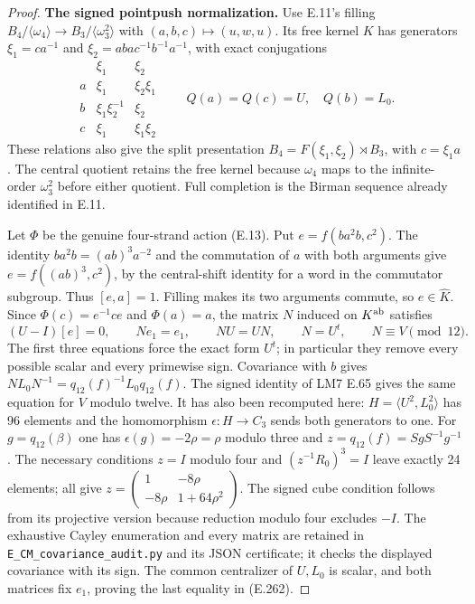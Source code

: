 \begin{proof}
\par\medskip\noindent\textbf{The signed pointpush normalization.}\quad
Use E.11's filling
$B_4/\langle\omega_4\rangle\to
B_3/\langle\omega_3^2\rangle$ with
$(a,b,c)\mapsto(u,w,u)$.
Its free kernel $K$ has generators
$\xi_1=ca^{-1}$ and
$\xi_2=aba c^{-1}b^{-1}a^{-1}$, with exact conjugations
\[
\begin{array}{c|cc}
 &\xi_1&\xi_2\\ \hline
 a&\xi_1&\xi_2\xi_1\\
 b&\xi_1\xi_2^{-1}&\xi_2\\
 c&\xi_1&\xi_1\xi_2
\end{array}
 \qquad Q(a)=Q(c)=U,\quad Q(b)=L_0.
                                                               \tag{E.261}
\]
These relations also give the split presentation
$B_4=F(\xi_1,\xi_2)\rtimes B_3$, with $c=\xi_1a$.
The central quotient retains the free kernel because
$\omega_4$ maps to the infinite-order $\omega_3^2$
before either quotient.  Full completion is the Birman
sequence already identified in E.11.

Let $\Phi$ be the genuine four-strand action (E.13).
Put $e=f(ba^2b,c^2)$.  The identity
$ba^2b=(ab)^3a^{-2}$ and the commutation of $a$ with
both arguments give $e=f((ab)^3,c^2)$, by the
central-shift identity for a word in the commutator
subgroup.  Thus $[e,a]=1$.  Filling makes its two
arguments commute, so $e\in\widehat K$.
Since $\Phi(c)=e^{-1}ce$ and $\Phi(a)=a$, the matrix
$N$ induced on $K^{\rm ab}$ satisfies
\[
 (U-I)[e]=0,\qquad Ne_1=e_1,\qquad NU=UN,
 \qquad N=U^t,\qquad N\equiv V\pmod {12}.
                                                               \tag{E.262}
\]
The first three equations force the exact form $U^t$;
in particular they remove every possible scalar and
every primewise sign.  Covariance with $b$ gives
$NL_0N^{-1}=q_{12}(f)^{-1}L_0q_{12}(f)$.
The signed identity of LM7 E.65 gives the same equation
for $V$ modulo twelve.  It has also been recomputed here:
$H=\langle U^2,L_0^2\rangle$ has 96 elements and the
homomorphism $\epsilon:H\to C_3$ sends both generators
to one.  For $g=q_{12}(\beta)$ one has
$\epsilon(g)=-2\rho=\rho$ modulo three and
$z=q_{12}(f)=SgS^{-1}g^{-1}$.  The necessary conditions
$z=I$ modulo four and $(z^{-1}R_0)^3=I$ leave exactly
24 elements; all give
$z=\left(\begin{smallmatrix}1&-8\rho\\
-8\rho&1+64\rho^2\end{smallmatrix}\right)$.
The signed cube condition follows from its projective
version because reduction modulo four excludes $-I$.
The exhaustive Cayley enumeration and every matrix are
retained in \texttt{E\_CM\_covariance\_audit.py} and
its JSON certificate; it checks the displayed covariance
with its sign.  The common centralizer of
$U,L_0$ is scalar, and both matrices fix $e_1$, proving
the last equality in (E.262).


\end{proof}
